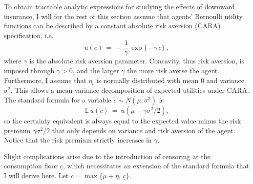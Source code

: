 To obtain tractable analytic expressions for studying the effects of downward insurance, I will for the rest of this section assume that agents' Bernoulli utility functions can be described by a constant absolute risk aversion (CARA) specification, i.e.
\begin{equation}
u(c) \, = \,  - \, \frac{1}{\gamma} \, \exp\{- \,  \gamma \, c \} \; ,
\end{equation}
where $\gamma$ is the absolute risk aversion parameter. Concavity, thus risk aversion, is imposed through $\gamma > 0$, and the larger $\gamma$ the more risk averse the agent. Furthermore, I assume that $\eta_i$ is normally distributed with mean $0$ and variance $\sigma^2$. This allows a mean-variance decomposition of expected utilities under CARA. The standard formula for a variable $\tilde{c} \sim N(\mu, \sigma^2)$ is
\begin{equation}
\mathbb{E} \, u(\tilde{c}) \: = \:  u\left(\mu -  \gamma \sigma^2 /2 \right),
\end{equation}
so the certainty equivalent is always equal to the expected value minus the risk premium $\gamma \sigma^2 /2$ that only depends on variance and risk aversion of the agent. Notice that the risk premium strictly increases in $\gamma$.

Slight complications arise due to the introduction of censoring at the consumption floor $\underline{c}$, which necessitates an extension of the standard formula that I will derive here. Let $c = \max\{\mu + \eta, \, \underline{c}\}$.

